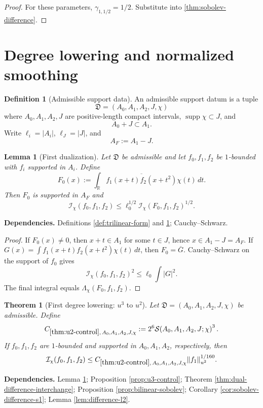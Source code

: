 \documentclass[11pt]{article}
\newtheorem{theorem}{Theorem}[section]
\newtheorem{lemma}[lemma]{Lemma}
\theoremstyle{definition}
\newtheorem{definition}[definition]{Definition}
\theoremstyle{remark}
\newcommand{\R}{\mathbb R}
\newcommand{\supp}{\operatorname{supp}}
\newcommand{\1}{\mathbf 1}
\newcommand{\dd}{\,d}
\newcommand{\Ichi}{\mathcal I_{\chi}}
\newcommand{\Lamchi}{\Lambda_{\chi}}
\newcommand{\uNorm}[2]{\lVert #1\rVert_{u^{#2}}}
\newcommand{\uses}[1]{\par\smallskip\noindent\textbf{Dependencies.} #1\par\smallskip}
\newcommand{\Ssize}[2]{\mathcal S\!\left(#1;#2\right)}
\begin{document}
\begin{proof}
For these parameters, $\gamma_{1,1/2}=1/2$.  Substitute into \cref{thm:sobolev-difference}.
\end{proof}

\section{Degree lowering and normalized smoothing}

\begin{definition}[Admissible support data]\label{def:admissible-data}
An admissible support datum is a tuple
\[
\mathfrak D=(A_0,A_1,A_2,J,\chi)
\]
where $A_0,A_1,A_2,J$ are positive-length compact intervals,
$\supp\chi\subset J$, and
\[
A_0+J\subset A_1.
\]
Write $\ell_i=\lvert A_i\rvert$, $\ell_J=\lvert J\rvert$, and
\[
A_F:=A_1-J.
\]
\end{definition}

\begin{lemma}[First dualization]\label{lem:first-dualization}
Let $\mathfrak D$ be admissible and let $f_0,f_1,f_2$ be $1$-bounded with $f_i$ supported in $A_i$.  Define
\[
F_0(x):=\int_\R\overline{f_1(x+t)f_2(x+t^2)}\chi(t)\dd t.
\]
Then $F_0$ is supported in $A_F$ and
\[
\Ichi(f_0,f_1,f_2)
\leq
\ell_0^{1/2}\Ichi(F_0,f_1,f_2)^{1/2}.
\]
\end{lemma}

\uses{Definitions \ref{def:trilinear-form} and \ref{def:admissible-data}; Cauchy--Schwarz.}

\begin{proof}
If $F_0(x)\neq0$, then $x+t\in A_1$ for some $t\in J$, hence $x\in A_1-J=A_F$.  If
$G(x)=\int f_1(x+t)f_2(x+t^2)\chi(t)\dd t$, then $F_0=\overline G$.  Cauchy--Schwarz on the support of $f_0$ gives
\[
\Ichi(f_0,f_1,f_2)^2\leq\ell_0\int|G|^2.
\]
The final integral equals $\Lamchi(F_0,f_1,f_2)$.
\end{proof}

\begin{theorem}[First degree lowering: \texorpdfstring{$u^3$ to $u^2$}{u3 to u2}]\label{thm:u2-control}
Let $\mathfrak D=(A_0,A_1,A_2,J,\chi)$ be admissible.  Define
\[
C_{\ref{thm:u2-control},\,A_0,A_1,A_2,J,\chi}
:=
2^6\Ssize{A_0,A_1,A_2,J}{\chi}^{3}.
\]
If $f_0,f_1,f_2$ are $1$-bounded and supported in $A_0,A_1,A_2$, respectively, then
\[
\Ichi(f_0,f_1,f_2)
\leq
C_{\ref{thm:u2-control},\,A_0,A_1,A_2,J,\chi}
\uNorm{f_1}2^{1/160}.
\]
\end{theorem}

\uses{Lemma \ref{lem:first-dualization}; Proposition \ref{prop:u3-control}; Theorem \ref{thm:dual-difference-interchange}; Proposition \ref{prop:bilinear-sobolev}; Corollary \ref{cor:sobolev-difference-s1}; Lemma \ref{lem:difference-l2}.}
\end{document}

